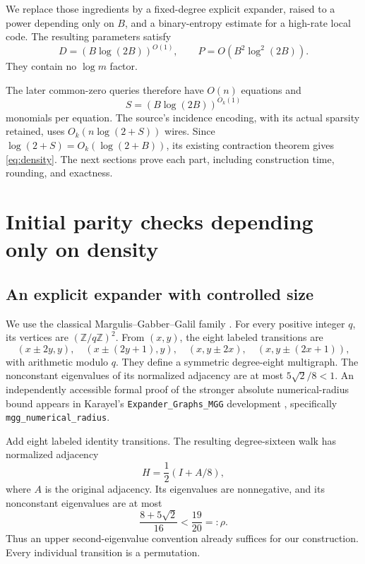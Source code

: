 \documentclass[11pt]{article}
\theoremstyle{remark}
\newcommand{\Z}{\mathbb Z}
\begin{document}
We replace those ingredients by a fixed-degree explicit expander,
raised to a power depending only on \(B\), and a binary-entropy estimate
for a high-rate local code. The resulting parameters satisfy
\begin{equation}\label{eq:new-parameters-summary}
 D=(B\log(2B))^{O(1)},\qquad
 P=O(B^2\log^2(2B)).
\end{equation}
They contain no \(\log m\) factor.

The later common-zero queries therefore have \(O(n)\) equations and
\[
 S=(B\log(2B))^{O_k(1)}
\]
monomials per equation. The source's incidence encoding, with its actual
sparsity retained, uses \(O_k(n\log(2+S))\) wires.
Since \(\log(2+S)=O_k(\log(2+B))\), its existing contraction theorem
gives \eqref{eq:density}. The next sections prove each part, including
construction time, rounding, and exactness.

\section{Initial parity checks depending only on density}\label{sec:checks}
\subsection{An explicit expander with controlled size}
We use the classical Margulis--Gabber--Galil family \cite{GG81}.
For every positive integer \(q\), its vertices are
\((\Z/q\Z)^2\). From \((x,y)\), the eight labeled transitions are
\[
 (x\pm2y,y),\quad (x\pm(2y+1),y),\quad
 (x,y\pm2x),\quad (x,y\pm(2x+1)),
\]
with arithmetic modulo \(q\).
They define a symmetric degree-eight multigraph. The nonconstant
eigenvalues of its normalized adjacency are at most
\(5\sqrt2/8<1\). An independently accessible formal proof of the
stronger absolute numerical-radius bound appears in
Karayel's \texttt{Expander\_Graphs\_MGG} development
\cite{Karayel23}, specifically \texttt{mgg\_numerical\_radius}.

Add eight labeled identity transitions. The resulting degree-sixteen
walk has normalized adjacency
\[
 H=\frac12(I+A/8),
\]
where \(A\) is the original adjacency. Its eigenvalues are nonnegative,
and its nonconstant eigenvalues are at most
\[
 \frac{8+5\sqrt2}{16}<\frac{19}{20}=:\rho.
\]
Thus an upper second-eigenvalue convention already suffices for our
construction. Every individual transition is a permutation.
\end{document}

